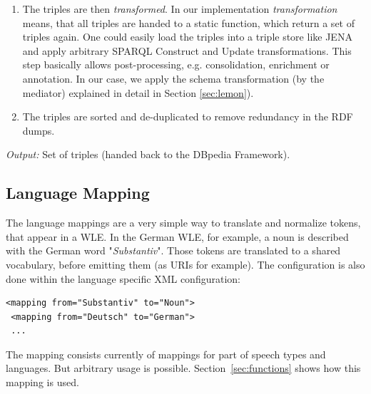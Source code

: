 \begin{enumerate}
\item The triples are then \textit{transformed}. 
In our implementation \textit{transformation} means, that all triples are handed to a static function, which return a set of triples again. 
One could easily load the triples into a triple store like JENA and apply arbitrary SPARQL Construct and Update transformations. 
This step basically allows post-processing, e.g. consolidation, enrichment or annotation. 
In our case, we apply the schema transformation (by the mediator) explained in detail in Section \ref{sec:lemon}).
\item The triples are sorted and de-duplicated to remove redundancy in the RDF dumps.
\end{enumerate}
\textit{Output:} Set of triples (handed back to the DBpedia Framework).

\subsection{Language Mapping}\label{sec:mapping}
The language mappings are a very simple way to translate and normalize tokens, that appear in a WLE. 
In the German WLE, for example, a noun is described with the German word "\textit{Substantiv}". 
Those tokens are translated to a shared vocabulary, before emitting them (as URIs for example). 
The configuration is also done within the language specific XML configuration:
\begin{lstlisting}[style=XML]
 <mapping from="Substantiv" to="Noun"> 
 <mapping from="Deutsch" to="German"> 
 ...
\end{lstlisting}
The mapping consists currently of mappings for part of speech types and languages. 
But arbitrary usage is possible. 
Section~\ref{sec:functions} shows how this mapping is used.

